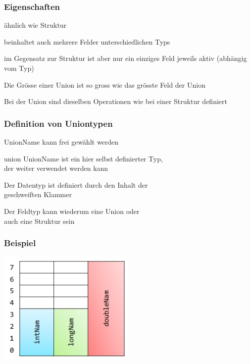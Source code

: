 		\subsubsection{Eigenschaften}
			\begin{compactitem}
				\item ähnlich wie Struktur
				\item beinhaltet auch mehrere Felder unterschiedlichen Typs
				\item im Gegensatz zur Struktur ist aber nur ein einziges Feld jeweils aktiv (abhängig vom Typ)
				\item Die Grösse einer Union ist so gross wie das grösste Feld der Union
				\item Bei der Union sind dieselben Operationen wie bei einer Struktur definiert 
			\end{compactitem}	
		\begin{minipage}[t]{10 cm}
			\subsubsection{Definition von Uniontypen}
				\vspace*{-0.2cm}
				
				\vspace*{0.3cm}
					\begin{compactitem}
						\item UnionName kann frei gewählt werden
						\item union UnionName ist ein hier selbst definierter Typ, \\der weiter verwendet werden kann
						\item Der Datentyp ist definiert durch den Inhalt der \\geschweiften Klammer
						\item Der Feldtyp kann wiederum eine Union oder \\auch eine Struktur sein
					\end{compactitem}
		\end{minipage}
		\hspace*{1.5cm}	
		\begin{minipage}[t]{8 cm}
			\subsubsection{Beispiel}
				\vspace*{-0.2cm}
				
				\vspace*{0.5cm}
				\includegraphics[width=0.5\textwidth]{pics/union.png}
		\end{minipage}
		\vspace*{0.8cm}
